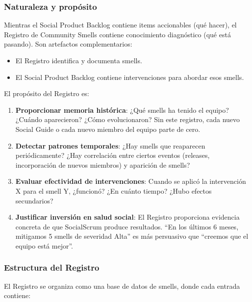 \subsubsection{Naturaleza y propósito}

Mientras el Social Product Backlog contiene items accionables (qué hacer), el Registro de Community Smells contiene conocimiento diagnóstico (qué está pasando). Son artefactos complementarios:

\begin{itemize}
    \item El Registro identifica y documenta smells.
    \item El Social Product Backlog contiene intervenciones para abordar esos smells.
\end{itemize}

El propósito del Registro es:

\begin{enumerate}
    \item \textbf{Proporcionar memoria histórica}: ¿Qué smells ha tenido el equipo? ¿Cuándo aparecieron? ¿Cómo evolucionaron? Sin este registro, cada nuevo Social Guide o cada nuevo miembro del equipo parte de cero.

    \item \textbf{Detectar patrones temporales}: ¿Hay smells que reaparecen periódicamente? ¿Hay correlación entre ciertos eventos (releases, incorporación de nuevos miembros) y aparición de smells?

    \item \textbf{Evaluar efectividad de intervenciones}: Cuando se aplicó la intervención X para el smell Y, ¿funcionó? ¿En cuánto tiempo? ¿Hubo efectos secundarios?

    \item \textbf{Justificar inversión en salud social}: El Registro proporciona evidencia concreta de que SocialScrum produce resultados. ``En los últimos 6 meses, mitigamos 5 smells de severidad Alta'' es más persuasivo que ``creemos que el equipo está mejor''.
\end{enumerate}

\subsubsection{Estructura del Registro}

El Registro se organiza como una base de datos de smells, donde cada entrada contiene:

